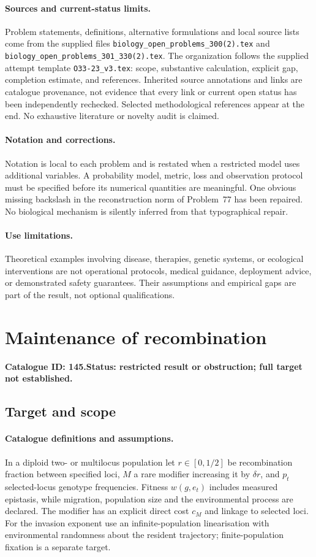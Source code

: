 \documentclass[11pt]{article}
\begin{document}
\paragraph{Sources and current-status limits.}
Problem statements, definitions, alternative formulations and local source lists
come from the supplied files
\texttt{biology\_open\_problems\_300(2).tex} and
\texttt{biology\_open\_problems\_301\_330(2).tex}.
The organization follows the supplied attempt template
\texttt{O33-23\_v3.tex}: scope, substantive calculation, explicit gap,
completion estimate, and references. Inherited source annotations and links are
catalogue provenance, not evidence that every link or current open status has
been independently rechecked. Selected methodological references appear at the
end. No exhaustive literature or novelty audit is claimed.

\paragraph{Notation and corrections.}
Notation is local to each problem and is restated when a restricted model uses
additional variables. A probability model, metric, loss and observation protocol
must be specified before its numerical quantities are meaningful. One obvious
missing backslash in the reconstruction norm of Problem~77 has been repaired.
No biological mechanism is silently inferred from that typographical repair.

\paragraph{Use limitations.}
Theoretical examples involving disease, therapies, genetic systems, or ecological
interventions are not operational protocols, medical guidance, deployment advice,
or demonstrated safety guarantees. Their assumptions and empirical gaps are part
of the result, not optional qualifications.

\setcounter{section}{144}
\section{Maintenance of recombination}
\label{prob:145}
\noindent\textbf{Catalogue ID: 145.}\quad \textbf{Status: restricted result or obstruction; full target not established.}
\subsection{Target and scope}
\paragraph{Catalogue definitions and assumptions.}
In a diploid two- or multilocus population let $r\in[0,1/2]$ be recombination fraction between specified loci, $M$ a rare modifier increasing it by $\delta r$, and $p_t$ selected-locus genotype frequencies. Fitness $w(g,e_t)$ includes measured epistasis, while migration, population size and the environmental process are declared. The modifier has an explicit direct cost $c_M$ and linkage to selected loci. For the invasion exponent use an infinite-population linearisation with environmental randomness about the resident trajectory; finite-population fixation is a separate target.
\end{document}
